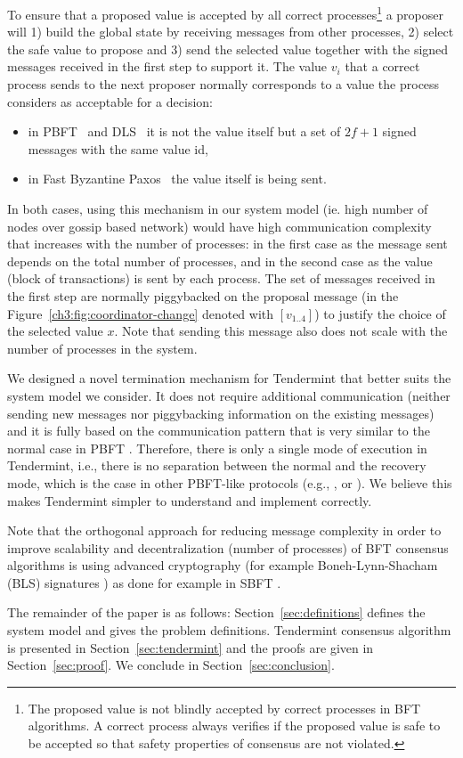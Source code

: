 To ensure that a proposed value is accepted by all correct
processes\footnote{The proposed value is not blindly accepted by correct
	processes in BFT algorithms. A correct process always verifies if the proposed
	value is safe to be accepted so that safety properties of consensus are not
	violated.}
a proposer will 1) build the global state by receiving messages from other
processes, 2) select the safe value to propose and 3) send the selected value
together with the signed messages
received in the first step to support it. The
value $v_i$ that a correct process sends to the next proposer normally
corresponds to a value the process considers as acceptable for a decision:

\begin{itemize} \item in PBFT~\cite{CL99:osdi} and DLS~\cite{DLS88:jacm} it is
	not the value itself but a set of $2f+1$ signed messages with the same
	value id, \item in Fast Byzantine Paxos~\cite{MA06:tdsc} the value
	itself is being sent.  \end{itemize}

In both cases, using this mechanism in our system model (ie. high
number of nodes over gossip based network) would have high communication
complexity that increases with the number of processes: in the first case as
the message sent depends on the total number of processes, and in the second
case as the value (block of transactions) is sent by each process. The set of
messages received in the first step are normally piggybacked on the proposal
message (in the Figure~\ref{ch3:fig:coordinator-change} denoted with
$[v_{1..4}]$) to justify the choice of the selected value $x$. Note that
sending this message also does not scale with the number of processes in the
system.

We designed a novel termination mechanism for Tendermint that better suits the
system model we consider. It does not require additional communication (neither
sending new messages nor piggybacking information on the existing messages) and
it is fully based on the communication pattern that is very similar to the
normal case in PBFT \cite{CL99:osdi}. Therefore, there is only a single mode of
execution in Tendermint, i.e., there is no separation between the normal and
the recovery mode, which is the case in other PBFT-like protocols (e.g.,
\cite{CL99:osdi}, \cite{Ver09:spinning} or \cite{Cle09:aardvark}). We believe
this makes Tendermint simpler to understand and implement correctly.

Note that the orthogonal approach for reducing message complexity in order to
improve
scalability and decentralization (number of processes) of BFT consensus
algorithms is using advanced cryptography (for example Boneh-Lynn-Shacham (BLS)
signatures \cite{BLS2001:crypto}) as done for example in SBFT
\cite{Gue2018:sbft}.

The remainder of the paper is as follows: Section~\ref{sec:definitions} defines
the system model and gives the problem definitions. Tendermint
consensus algorithm is presented in Section~\ref{sec:tendermint} and the
proofs are given in Section~\ref{sec:proof}. We conclude in
Section~\ref{sec:conclusion}.




